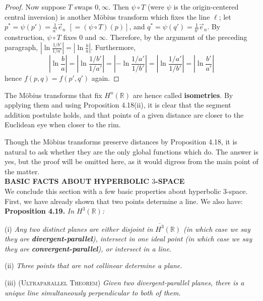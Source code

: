 \documentclass[leqno]{book}
\begin{document}
\begin{proof}
Now suppose $T$ swaps $0,\infty$.  Then $\psi\circ T$ (were $\psi$ is the origin-centered central inversion) is another M\"obius transform which fixes the line $\ell$; let $p^*=\psi(p')=\frac 1{a'}\vec e_n$ $[=(\psi\circ T)(p)]$, and $q^*=\psi(q')=\frac 1{b'}\vec e_n$.  By construction, $\psi\circ T$ fixes $0$ and $\infty$.  Therefore, by the argument of the preceding paragraph, $\left|\ln\frac{1/b'}{1/a'}\right|=\left|\ln\frac ba\right|$.  Furthermore,
$$\left|\ln\frac ba\right|=\left|\ln\frac{1/b'}{1/a'}\right|=\left|-\ln\frac{1/a'}{1/b'}\right|=\left|\ln\frac{1/a'}{1/b'}\right|=\left|\ln\frac{b'}{a'}\right|$$
hence $f(p,q)=f(p',q')$ again.
\end{proof}

\noindent The M\"obius transforms that fix $H^n(\mathbb R)$ are hence called \textbf{isometries}.  By applying them and using Proposition 4.18(ii), it is clear that the segment addition postulate holds, and that points of a given distance are closer to the Euclidean eye when closer to the rim.

Though the M\"obius transforms preserve distances by Proposition 4.18, it is natural to ask whether they are the only global functions which do.  The answer is yes, but the proof will be omitted here, as it would digress from the main point of the matter.\\

\noindent\textbf{BASIC FACTS ABOUT HYPERBOLIC $3$-SPACE}\\

\noindent We conclude this section with a few basic properties about hyperbolic $3$-space.  First, we have already shown that two points determine a line.  We also have:\\

\noindent\textbf{Proposition 4.19.} \emph{In $H^3(\mathbb R)$:}

(i) \emph{Any two distinct planes are either disjoint in $\overline{H^3}(\mathbb R)$ (in which case we say they are \textbf{divergent-parallel}), intersect in one ideal point (in which case we say they are \textbf{convergent-parallel}), or intersect in a line.}

(ii) \emph{Three points that are not collinear determine a plane.}

(iii) \textsc{(Ultraparallel Theorem)} \emph{Given two divergent-parallel planes, there is a unique line simultaneously perpendicular to both of them.}\\
\end{document}
